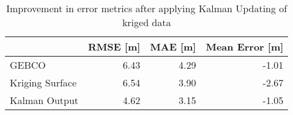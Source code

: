 \begin{table}
\centering
\caption{Improvement in error metrics after applying Kalman Updating of kriged data}
\label{tab:stcroix_gebco_raster_error}
\begin{tabular}{lrrr}
\toprule
 & RMSE [m] & MAE [m] & Mean Error [m] \\
\midrule
GEBCO & 6.43 & 4.29 & -1.01 \\
Kriging Surface & 6.54 & 3.90 & -2.67 \\
Kalman Output & 4.62 & 3.15 & -1.05 \\
\bottomrule
\end{tabular}
\end{table}
